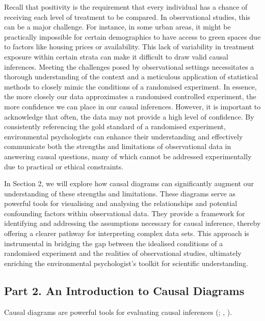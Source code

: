 \documentclass[
  singlecolumn]{article}
\begin{document}
Recall that positivity is the requirement that every individual has a
chance of receiving each level of treatment to be compared. In
observational studies, this can be a major challenge. For instance, in
some urban areas, it might be practically impossible for certain
demographics to have access to green spaces due to factors like housing
prices or availability. This lack of variability in treatment exposure
within certain strata can make it difficult to draw valid causal
inferences. Meeting the challenges posed by observational settings
necessitates a thorough understanding of the context and a meticulous
application of statistical methods to closely mimic the conditions of a
randomised experiment. In essence, the more closely our data
approximates a randomised controlled experiment, the more confidence we
can place in our causal inferences. However, it is important to
acknowledge that often, the data may not provide a high level of
confidence. By consistently referencing the gold standard of a
randomised experiment, environmental psychologists can enhance their
understanding and effectively communicate both the strengths and
limitations of observational data in answering causal questions, many of
which cannot be addressed experimentally due to practical or ethical
constraints.

In Section 2, we will explore how causal diagrams can significantly
augment our understanding of these strengths and limitations. These
diagrams serve as powerful tools for visualising and analysing the
relationships and potential confounding factors within observational
data. They provide a framework for identifying and addressing the
assumptions necessary for causal inference, thereby offering a clearer
pathway for interpreting complex data sets. This approach is
instrumental in bridging the gap between the idealised conditions of a
randomised experiment and the realities of observational studies,
ultimately enriching the environmental psychologist's toolkit for
scientific understanding.

\subsection{Part 2. An Introduction to Causal
Diagrams}\label{part-2.-an-introduction-to-causal-diagrams}

Causal diagrams are powerful tools for evaluating causal inferences
(;
, ).
\end{document}
